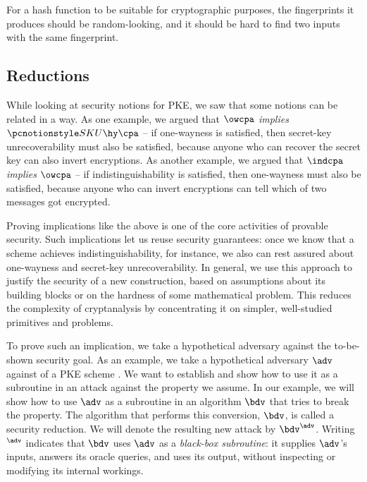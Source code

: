       For a hash function to be suitable for cryptographic purposes, the
        fingerprints it produces should be random-looking, and it should be hard
        to find two inputs with the same fingerprint. 

  \subsection{Reductions}
  
  	While looking at security notions for PKE, we saw that some notions can be related in a way.
  	As one example, we argued that $\owcpa$ \emph{implies} $\skucpa$ -- if one-wayness is satisfied, then 
  	secret-key unrecoverability must also be satisfied,
  	because anyone who can recover the secret key can also invert encryptions.
  	As another example, we argued that $\indcpa$ \emph{implies} $\owcpa$ -- if indistinguishability is satisfied, then 
  	one-wayness must also be satisfied,
  	because anyone who can invert encryptions can tell which of two messages got encrypted.
  	
  	Proving implications like the above is one of the core activities of provable security.
  	Such implications let us reuse security guarantees: once we know that a scheme achieves indistinguishability,
  	for instance, we also can rest assured about one-wayness and secret-key unrecoverability.
  	In general, we use this approach to justify the security of a new construction,
  	based on assumptions about its building blocks or on the hardness of some mathematical problem.
  	This reduces the complexity of cryptanalysis by concentrating it on simpler, well-studied primitives and problems.
  	
  	
  	To prove such an implication, we take a hypothetical adversary against the to-be-shown security goal.
  	As an example, we take a hypothetical adversary $\adv$ against \owcpa of a PKE scheme \pkescheme.
  	We want to establish and show how to use it as a subroutine in an attack against the property we assume.
  	In our example, we will show how to use $\adv$ as a subroutine in an algorithm $\bdv$ that tries to break the \indcpa property.
  	The algorithm that performs this conversion, $\bdv$, is called a security reduction.
  	We will denote the resulting new attack by $\bdv^\adv$.
  	Writing ${}^\adv$ indicates that $\bdv$ uses $\adv$ as a \emph{black-box subroutine}:
  	it supplies $\adv$’s inputs, answers its oracle queries, and uses its output, without inspecting or modifying its internal workings.
  	
